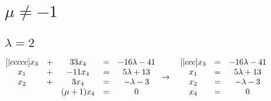 \documentclass{article}
\begin{document}
    \section{\(\mu \neq -1\)}
    \subsection{\(\lambda = 2\)}
    \begin{math}
       \begin{matrix}[|ccccc]
            x_3 & + & 33x_4 & = & -16\lambda - 41\\
            x_1 & + & -11x_4 & = & 5\lambda + 13\\
            x_2 & + & 3x_4 & = & -\lambda - 3\\
            ~ & ~ & (\mu + 1)x_4 & = & 0\\
        \end{matrix}\\
        \\
        \\
        \to\quad
        \begin{matrix}[|ccc]
            x_3 & = & -16\lambda - 41\\
            x_1 & = & 5\lambda + 13\\
            x_2 & = & -\lambda - 3\\
            x_4 & = & 0\\
        \end{matrix}\\
    \end{math}
\end{document}
